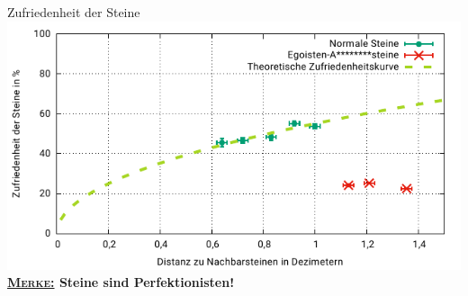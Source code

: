 \documentclass[11pt]{beamer}
\begin{document}
	\appendix
	\begin{frame}{Zufriedenheit der Steine}
		\centering
		\includegraphics[width=.85\textheight]{zufriedenheit} \\
		
		\flushleft
		\textbf{\underline{\textsc{Merke:}}\hspace{1em} Steine sind Perfektionisten!}
	\end{frame}
\end{document}
